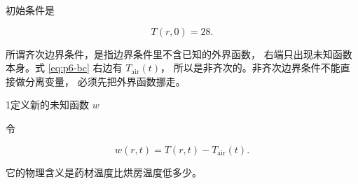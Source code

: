 初始条件是

\begin{equation}
T(r,0)=28 .
\label{eq:p6-ic}
\end{equation}

所谓齐次边界条件，是指边界条件里不含已知的外界函数，
右端只出现未知函数本身。式 \eqref{eq:p6-bc} 右边有 $T_{\mathrm{air}}(t)$，
所以是非齐次的。非齐次边界条件不能直接做分离变量，
必须先把外界函数挪走。

\begin{stepbox}{1}{定义新的未知函数 $w$}

令

\begin{equation}
w(r,t)=T(r,t)-T_{\mathrm{air}}(t).
\label{eq:p6-w}
\end{equation}

它的物理含义是药材温度比烘房温度低多少。

\end{stepbox}

